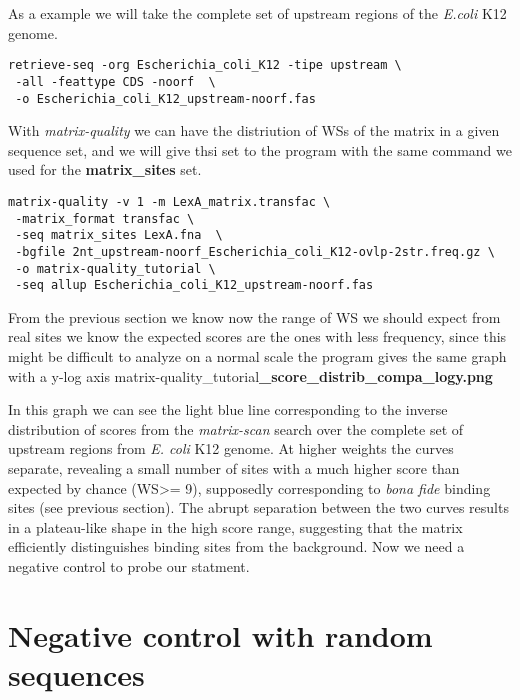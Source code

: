 As a example we will take the complete set of upstream regions of the
\textit{E.coli} K12 genome.

{\color{Blue} \begin{footnotesize}
\begin{verbatim}
retrieve-seq -org Escherichia_coli_K12 -tipe upstream \
 -all -feattype CDS -noorf  \
 -o Escherichia_coli_K12_upstream-noorf.fas
\end{verbatim} \end{footnotesize} }

With \textit{matrix-quality} we can have the distriution of WSs of the
matrix in a given sequence set, and we will give thsi set to the
program with the same command we used for the
\textbf{matrix\_sites} set.

{\color{Blue} \begin{footnotesize}
\begin{verbatim}
matrix-quality -v 1 -m LexA_matrix.transfac \
 -matrix_format transfac \
 -seq matrix_sites LexA.fna  \
 -bgfile 2nt_upstream-noorf_Escherichia_coli_K12-ovlp-2str.freq.gz \
 -o matrix-quality_tutorial \
 -seq allup Escherichia_coli_K12_upstream-noorf.fas

\end{verbatim} \end{footnotesize} }

From the previous section we know now the range of WS we should expect
from real sites we know the expected scores are the ones with less
frequency, since this might be difficult to analyze on a normal scale
the program gives the same graph with a y-log axis
matrix-quality\_tutorial\textbf{\_score\_distrib\_compa\_logy.png}

In this graph we can see the light blue line corresponding to the
inverse distribution of scores from the \textit{matrix-scan} search
over the complete set of upstream regions from \textit{E. coli} K12
genome. At higher weights the curves separate, revealing a small
number of sites with a much higher score than expected by chance (WS>=
9), supposedly corresponding to \textit{bona fide} binding sites (see
previous section). The abrupt separation between the two curves
results in a plateau-like shape in the high score range, suggesting
that the matrix efficiently distinguishes binding sites from the
background. Now we need a negative control to probe our statment.

\section{Negative control with random sequences}

